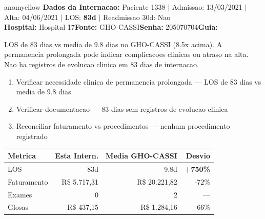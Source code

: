 \documentclass[a4paper,10pt]{article}
\begin{document}
\newpage

\begin{anomalycard}[Internacao 1131 | GHO-CASSI | MODERADO (z=2.01)]{anomyellow}
\textbf{Dados da Internacao:} Paciente 1338 $\mid$ Admissao: 13/03/2021 $\mid$ Alta: 04/06/2021 $\mid$ LOS: \textbf{83d} $\mid$ Readmissao 30d: Nao\\
\textbf{Hospital:} Hospital 17\quad\textbf{Fonte:} GHO-CASSI\quad\textbf{Senha:} 205070704\quad\textbf{Guia:} ---\\
\vspace{2pt}\begin{tcolorbox}[colback=severityred!20,colframe=anomyellow,title={\textbf{Interpretacao de Negocio}},fonttitle=\bfseries\small,left=4pt,right=4pt,top=3pt,bottom=3pt]
{\small LOS de 83 dias vs media de 9.8 dias no GHO-CASSI (8.5x acima). A permanencia prolongada pode indicar complicacoes clinicas ou atraso na alta. Nao ha registros de evolucao clinica em 83 dias de internacao.}
\end{tcolorbox}
\begin{tcolorbox}[colback=severityyellow!30,colframe=anomorange,title={\textbf{Recomendacoes Especificas}},fonttitle=\bfseries\small,left=4pt,right=4pt,top=3pt,bottom=3pt]
\begin{enumerate}[nosep,leftmargin=16pt]
\item {\small Verificar necessidade clinica de permanencia prolongada --- LOS de 83 dias vs media de 9.8 dias}
\item {\small Verificar documentacao --- 83 dias sem registros de evolucao clinica}
\item {\small Reconciliar faturamento vs procedimentos --- nenhum procedimento registrado}
\end{enumerate}
\end{tcolorbox}
\begin{center}\begin{tabular}{l r r r}\toprule\textbf{Metrica} & \textbf{Esta Intern.} & \textbf{Media GHO-CASSI} & \textbf{Desvio} \\\midrule
LOS & 83d & 9.8d & \textcolor{anomred}{\textbf{+750\%}} \\
Faturamento & R\$ 5.717,31 & R\$ 20.221,82 & -72\% \\
Exames & 0 & 2 & --- \\
Glosas & R\$ 437,15 & R\$ 1.284,16 & -66\% \\
\bottomrule\end{tabular}\end{center}


\end{anomalycard}
\end{document}
